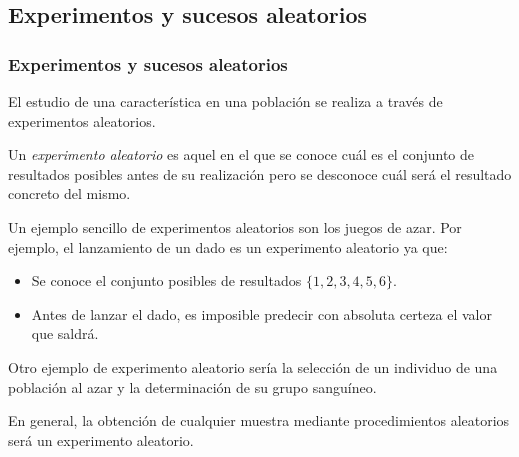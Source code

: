 \subsection{Experimentos y sucesos aleatorios}

\begin{frame}
\frametitle{Experimentos y sucesos aleatorios}
El estudio de una característica en una población se realiza a través de experimentos aleatorios.

\begin{definicion} Un \emph{experimento aleatorio} es aquel en el que se conoce cuál es el conjunto de resultados
posibles antes de su realización pero se desconoce cuál será el resultado concreto del mismo.
\end{definicion}

Un ejemplo sencillo de experimentos aleatorios son los juegos de azar. Por ejemplo, el lanzamiento de un dado es un experimento aleatorio ya
que:
\begin{itemize}
\item Se conoce el conjunto posibles de resultados $\{1,2,3,4,5,6\}$.
\item Antes de lanzar el dado, es imposible predecir con absoluta certeza el valor que saldrá. 
\end{itemize}

Otro ejemplo de experimento aleatorio sería la selección de un individuo de una población al azar y la determinación de su grupo sanguíneo.

En general, la obtención de cualquier muestra mediante procedimientos aleatorios será un experimento aleatorio.  

\end{frame}
